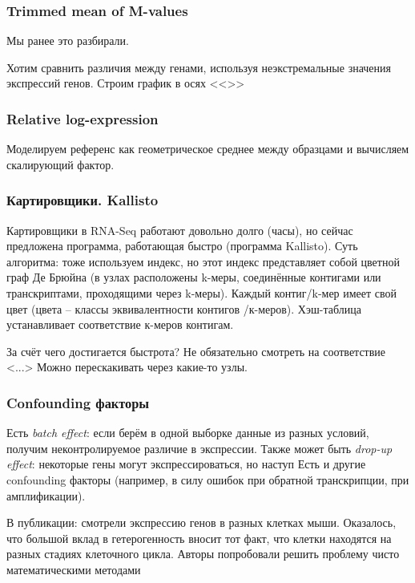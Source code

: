 \documentclass[main.tex]{subfiles}
\begin{document}
\subsubsection{Trimmed mean of M-values}

Мы ранее это разбирали.

Хотим сравнить различия между генами, используя неэкстремальные значения экспрессий генов.
Строим график в осях <<>> %

\subsubsection{Relative log-expression}

Моделируем референс как геометрическое среднее между образцами и вычисляем скалирующий фактор.

\subsubsection{Картировщики. Kallisto}

Картировщики в RNA-Seq работают довольно долго (часы), но сейчас предложена программа, работающая быстро (программа Kallisto).
Суть алгоритма: тоже используем индекс, но этот индекс представляет собой цветной граф Де Брюйна (в узлах расположены k-меры, соединённые контигами или транскриптами, проходящими через k-меры).
Каждый контиг/k-мер имеет свой цвет (цвета -- классы эквивалентности контигов /к-меров).
Хэш-таблица устанавливает соответствие к-меров контигам. %

За счёт чего достигается быстрота?
Не обязательно смотреть на соответствие <...> %
Можно перескакивать через какие-то узлы.

\subsubsection{Confounding факторы}

Есть \emph{batch effect}: если берём в одной выборке данные из разных условий, получим неконтролируемое различие в экспрессии.
Также может быть \emph{drop-up effect}: некоторые гены могут экспрессироваться, но наступ
Есть и другие confounding факторы (например, в силу ошибок при обратной транскрипции, при амплификации).

В публикации: смотрели экспрессию генов в разных клетках мыши.
Оказалось, что большой вклад в гетерогенность вносит тот факт, что клетки находятся на разных стадиях клеточного цикла. %
Авторы попробовали решить проблему чисто математическими методами %
\end{document}
